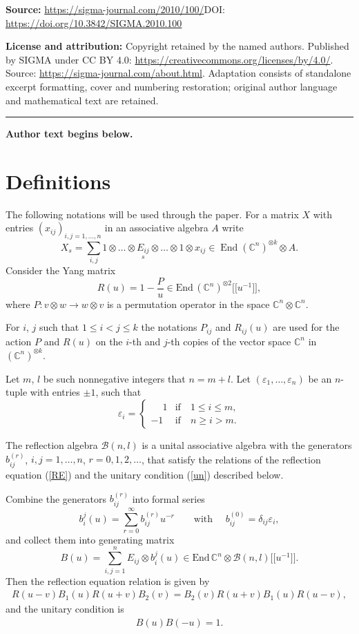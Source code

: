 \documentclass[11pt]{article}
\newcommand{\CC}{\mathbb C}    %
\newcommand{\B}{\mathcal B}
\begin{document}
\noindent\textbf{Source:} \url{https://sigma-journal.com/2010/100/}\quad DOI: \url{https://doi.org/10.3842/SIGMA.2010.100}\par
\noindent\textbf{License and attribution:} Copyright retained by the named authors. Published by SIGMA under CC BY 4.0: \url{https://creativecommons.org/licenses/by/4.0/}. Source: \url{https://sigma-journal.com/about.html}. Adaptation consists of standalone excerpt formatting, cover and numbering restoration; original author language and mathematical text are retained.\par
\medskip\hrule\medskip\noindent\textbf{Author text begins below.}\par
\setcounter{section}{0}
\setcounter{subsection}{0}
\setcounter{subsubsection}{0}
\setcounter{equation}{0}
\section{Def\/initions}\label{section1}
The following  notations will be used through the paper.
For a matrix  $X$ with entries $(x_{ij})_{i,j=1,\dots, n}$ in an  associative algebra $A$ write
\[
X_s=\sum_{i,j}1\otimes\dots\otimes \underset{s}{E_{ij}}\otimes\dots \otimes 1\otimes x_{ij} \in\operatorname{End}(\CC^n)^{\otimes k}\otimes A.
\]
 Consider the Yang matrix
\[
R(u)=1-\frac{P}{u}  \in \text{End}\,(\CC^n)^{\otimes 2}\big[\big[u^{-1}\big]\big],
\]
where $P:v\otimes w\to w\otimes v$ is a permutation operator in the space $\CC^n\otimes\CC^n$.

 For $i$, $j$ such that $1\le i < j\le k$ the notations $P_{ij}$ and
  $R_{ij}(u)$   are used  for the  action $P$ and  $R(u)$ on the $i$-th and $j$-th copies of  the vector space $\CC^n$ in $(\CC^n)^{\otimes k}$.

 Let $m$, $l$ be such nonnegative integers that $n=m+l$. Let $(\varepsilon _1,\dots, \varepsilon_n)$ be an $n$-tuple with entries $\pm 1$, such that
\[
 \varepsilon_i=
 \begin{cases}
\phantom{-}1& \text{if}\quad 1\le i\le m,\\
 {-}1& \text{if}\quad n\ge i> m.
 \end{cases}
\]

 The ref\/lection algebra $\B(n,l)$ is a unital associative algebra with the generators $b_{ij}^{(r)}$, $i,j=1,\dots, n$, $r= 0,1, 2,\dots $, that satisfy the  relations of the ref\/lection equation (\ref{RE}) and the unitary condition (\ref{un}) described below.

Combine the generators $b_{ij}^{(r)}$ into formal series
\[
b_i^{j}(u)=\sum_{r=0}^{\infty}b_{ij}^{(r)}u^{-r}\qquad \text{with }\quad
b^{(0)}_{ij}=\delta_{ij}\varepsilon_{i},
\]
and collect them into generating matrix
\[
B(u)=\sum_{i,j=1}^{n} E_{ij}\otimes b_i^{j}(u)\in \text{End}\, \CC^n\otimes \B(n,l)\big[\big[u^{-1}\big]\big].
\]
Then the ref\/lection equation  relation is given by
\begin{gather}\label{RE}
R(u-v)B_1(u)R(u+v)B_2(v)=B_2(v)R(u+v)B_1(u)R(u-v),
\end{gather}
and the unitary condition  is
\begin{gather}\label{un}
B(u)B(-u)=1.
\end{gather}
\end{document}
